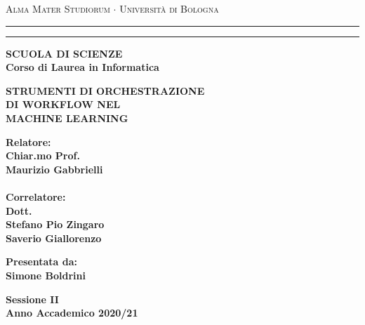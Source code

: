 \documentclass[../tesi.tex]{subfiles}
\begin{document}
\begin{titlepage}
\begin{center}
{{\Large{\textsc{Alma Mater Studiorum $\cdot$ Universit\`a di
Bologna}}}} \rule[0.1cm]{15.8cm}{0.1mm}
\rule[0.5cm]{15.8cm}{0.6mm}
{\small{\bf SCUOLA DI SCIENZE\\
Corso di Laurea in Informatica }}
\end{center}
\vspace{15mm}
\begin{center}
{\LARGE{\bf STRUMENTI DI ORCHESTRAZIONE}}\\
\vspace{3mm}
{\LARGE{\bf DI WORKFLOW NEL}}\\
\vspace{3mm}
{\LARGE{\bf MACHINE LEARNING}}\\
\end{center}
\vspace{40mm}
\par
\noindent
\begin{minipage}[t]{0.47\textwidth}
{\large{\bf Relatore:\\
Chiar.mo Prof.\\
Maurizio Gabbrielli}}\\
\\{\large{\bf Correlatore:\\
Dott.\\Stefano Pio Zingaro\\Saverio Giallorenzo}}
\end{minipage}
\hfill
\begin{minipage}[t]{0.47\textwidth}\raggedleft
{\large{\bf Presentata da:\\ Simone Boldrini}}
\end{minipage}
\vspace{20mm}
\begin{center}
{\large{\bf Sessione II\\
Anno Accademico 2020/21}}
\end{center}
\end{titlepage}
\end{document}
